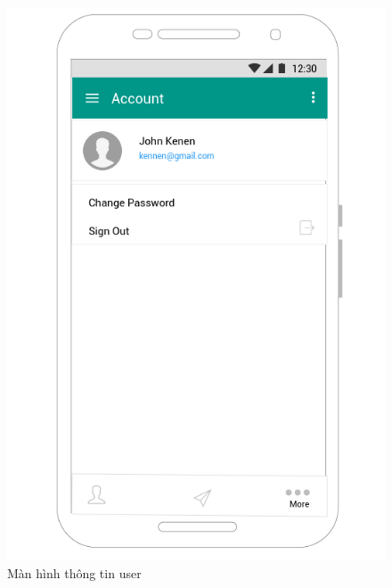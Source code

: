 \documentclass[a4paper]{article}
\begin{document}
\begin{figure}[h]
    \includegraphics[scale=0.6]{Mockup/AC_user}
    \centering
    \caption{Màn hình thông tin user}
    \label{fig:AC_user}
\end{figure}
\end{document}
